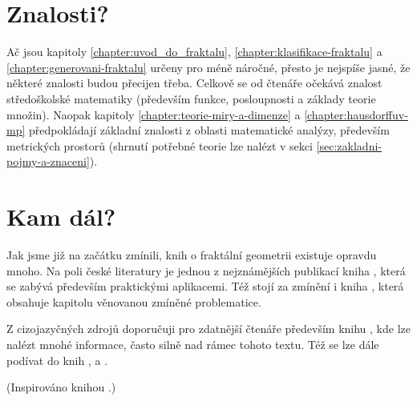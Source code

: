 \section*{Znalosti?}

Ač jsou kapitoly \ref{chapter:uvod_do_fraktalu}, \ref{chapter:klasifikace-fraktalu} a \ref{chapter:generovani-fraktalu} určeny pro méně náročné, přesto je nejspíše jasné, že některé znalosti budou přecijen třeba. Celkově se od čtenáře očekává znalost středoškolské matematiky (především funkce, posloupnosti a základy teorie množin). Naopak kapitoly \ref{chapter:teorie-miry-a-dimenze} a \ref{chapter:hausdorffuv-mp} předpokládají základní znalosti z oblasti matematické analýzy, především metrických prostorů (shrnutí potřebné teorie lze nalézt v sekci \ref{sec:zakladni-pojmy-a-znaceni}).

\section*{Kam dál?}

Jak jsme již na začátku zmínili, knih o fraktální geometrii existuje opravdu mnoho. Na poli české literatury je jednou z nejznámějších publikací kniha \cite{Zelinka2006}, která se zabývá především praktickými aplikacemi. Též stojí za zmínění i kniha \cite{Voracova2022}, která obsahuje kapitolu věnovanou zmíněné problematice.

Z cizojazyčných zdrojů doporučuji pro zdatnější čtenáře především knihu \cite{Falconer1989}, kde lze nalézt mnohé informace, často silně nad rámec tohoto textu. Též se lze dále podívat do knih \cite{Prusinkiewicz1990}, \cite{Edgar2008} a \cite{Mattila1995}.

(Inspirováno knihou \cite{Hladik2019}.)